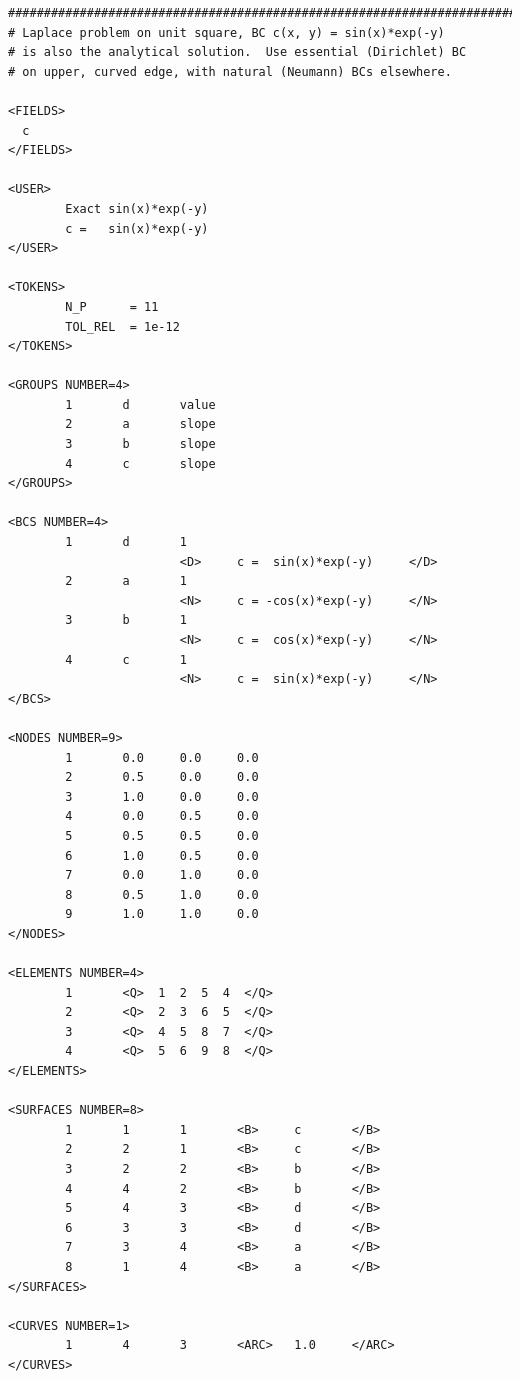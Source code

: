 \documentclass[11pt]{report}
\begin{document}
{\small
\begin{verbatim}
##############################################################################
# Laplace problem on unit square, BC c(x, y) = sin(x)*exp(-y)
# is also the analytical solution.  Use essential (Dirichlet) BC
# on upper, curved edge, with natural (Neumann) BCs elsewhere.

<FIELDS>
  c
</FIELDS>

<USER>  
        Exact sin(x)*exp(-y)
        c =   sin(x)*exp(-y)
</USER>

<TOKENS>
        N_P      = 11
        TOL_REL  = 1e-12
</TOKENS>

<GROUPS NUMBER=4>
        1       d       value
        2       a       slope
        3       b       slope
        4       c       slope
</GROUPS>

<BCS NUMBER=4>
        1       d       1
                        <D>     c =  sin(x)*exp(-y)     </D>
        2       a       1
                        <N>     c = -cos(x)*exp(-y)     </N>
        3       b       1
                        <N>     c =  cos(x)*exp(-y)     </N>
        4       c       1
                        <N>     c =  sin(x)*exp(-y)     </N>
</BCS>

<NODES NUMBER=9>
        1       0.0     0.0     0.0
        2       0.5     0.0     0.0
        3       1.0     0.0     0.0
        4       0.0     0.5     0.0
        5       0.5     0.5     0.0
        6       1.0     0.5     0.0
        7       0.0     1.0     0.0
        8       0.5     1.0     0.0
        9       1.0     1.0     0.0
</NODES>

<ELEMENTS NUMBER=4>
        1       <Q>  1  2  5  4  </Q>
        2       <Q>  2  3  6  5  </Q>
        3       <Q>  4  5  8  7  </Q>
        4       <Q>  5  6  9  8  </Q>
</ELEMENTS>

<SURFACES NUMBER=8>
        1       1       1       <B>     c       </B>
        2       2       1       <B>     c       </B>
        3       2       2       <B>     b       </B>
        4       4       2       <B>     b       </B>
        5       4       3       <B>     d       </B>
        6       3       3       <B>     d       </B>
        7       3       4       <B>     a       </B>
        8       1       4       <B>     a       </B>
</SURFACES>

<CURVES NUMBER=1>
        1       4       3       <ARC>   1.0     </ARC>
</CURVES>
\end{verbatim}
}
\end{document}
